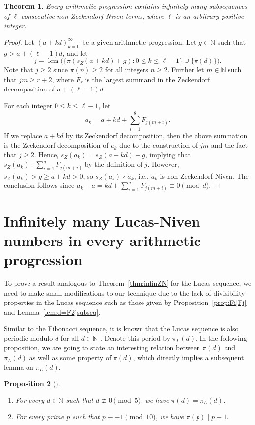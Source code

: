 \documentclass[12pt]{article}
\newtheorem{theorem}{Theorem}[section]
\newtheorem{proposition}[theorem]{Proposition}
\theoremstyle{definition}
\newcommand{\N}{\mathbb{N}}
\DeclareMathOperator{\lcm}{lcm}
\begin{document}
\begin{theorem}\label{thm:nonZN}
Every arithmetic progression contains infinitely many subsequences of $\ell$ consecutive non-Zeckendorf-Niven terms, where $\ell$ is an arbitrary positive integer.
\end{theorem}
\begin{proof}
Let $(a+kd)_{k=0}^\infty$ be a given arithmetic progression. Let $g\in\N$ such that $g>a+(\ell-1)d$, and let
\[j=\lcm\big(\{\pi(s_Z(a+kd)+g):0\leq k\leq\ell-1\}\cup\{\pi(d)\}\big).\]
Note that $j\geq2$ since $\pi(n)\geq2$ for all integers $n\geq2$. Further let $m\in\N$ such that $jm\geq r+2$, where $F_r$ is the largest summand in the Zeckendorf decomposition of $a+(\ell-1)d$.

For each integer $0\leq k\leq\ell-1$, let
\[a_k=a+kd+\sum_{i=1}^gF_{j(m+i)}.\]
If we replace $a+kd$ by its Zeckendorf decomposition, then the above summation is the Zeckendorf decomposition of $a_k$ due to the construction of $jm$ and the fact that $j\geq2$. Hence, $s_Z(a_k)=s_Z(a+kd)+g$, implying that $s_Z(a_k)\mid\sum_{i=1}^gF_{j(m+i)}$ by the definition of $j$. However, $s_Z(a_k)>g\geq a+kd>0$, so $s_Z(a_k)\nmid a_k$, i.e., $a_k$ is non-Zeckendorf-Niven. The conclusion follows since $a_k-a=kd+\sum_{i=1}^gF_{j(m+i)}\equiv0\pmod{d}$.
\end{proof}






\section{Infinitely many Lucas-Niven numbers in every arithmetic progression}\label{sec:infinLN}

To prove a result analogous to Theorem~\ref{thm:infinZN} for the Lucas sequence, we need to make small modifications to our technique due to the lack of divisibility properties in the Lucas sequence such as those given by Proposition~\ref{prop:Fi|Fj} and Lemma~\ref{lem:d=F2jsubseq}.

Similar to the Fibonacci sequence, it is known that the Lucas sequence is also periodic modulo $d$ for all $d\in\N$ \cite{wall}. Denote this period by $\pi_L(d)$. In the following proposition, we are going to state an interesting relation between $\pi(d)$ and $\pi_L(d)$ as well as some property of $\pi(d)$, which directly implies a subsequent lemma on $\pi_L(d)$.

\begin{proposition}[\cite{wall}]\label{prop:piandpiL}\ 
\begin{enumerate}[$(i)$]
\item For every $d\in\N$ such that $d\not\equiv0\pmod{5}$, we have $\pi(d)=\pi_L(d)$.
\item\label{item:piL} For every prime $p$ such that $p\equiv-1\pmod{10}$, we have $\pi(p)\mid p-1$.
\end{enumerate}
\end{proposition}
\end{document}
